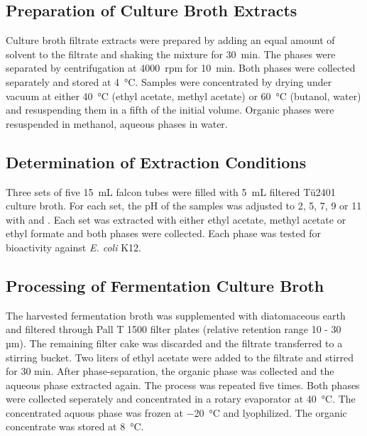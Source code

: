 	\subsection{Preparation of Culture Broth Extracts} %
	\label{sub:preparation_of_medium_extracts}

	Culture broth filtrate extracts were prepared by adding an equal amount of solvent to the filtrate and shaking the mixture for \SI{30}{\minute}. The phases were separated by centrifugation at 4000~rpm for \SI{10}{\minute}. Both phases were collected separately and stored at \SI{4}{\celsius}. Samples were concentrated by drying under vacuum at either \SI{40}{\celsius} (ethyl acetate, methyl acetate) or \SI{60}{\celsius} (butanol, water) and resuspending them in a fifth of the initial volume. Organic phases were resuspended in methanol, aqueous phases in water.


	\subsection{Determination of Extraction Conditions} %
	\label{sub:determination_of_extraction_conditions}

	Three sets of five \SI{15}{\milli\liter} falcon tubes were filled with \SI{5}{\milli\liter} filtered Tü2401 culture broth. For each set, the pH of the samples was adjusted to 2, 5, 7, 9 or 11 with  and . Each set was extracted with either ethyl acetate, methyl acetate or ethyl formate and both phases were collected. Each phase was tested for bioactivity against \textit{E. coli} K12.


	\subsection{Processing of Fermentation Culture Broth} %
	\label{sub:processing_of_fermentation_broth}
	The harvested fermentation broth was supplemented with diatomaceous earth and filtered through Pall T 1500 filter plates (relative retention range 10 - 30 µm). The remaining filter cake was discarded and the filtrate transferred to a stirring bucket. Two liters of ethyl acetate were added to the filtrate and stirred for 30 min. After phase-separation, the organic phase was collected and the aqueous phase extracted again. The process was repeated five times. Both phases were collected seperately and concentrated in a rotary evaporator at \SI{40}{\celsius}. The concentrated aquous phase was frozen at \SI{-20}{\celsius} and lyophilized. The organic concentrate was stored at \SI{8}{\celsius}.

